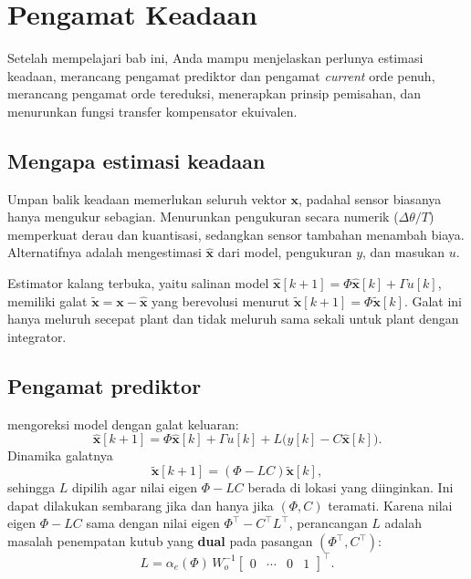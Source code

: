 \chapter{Pengamat Keadaan}
\label{bab:obs}

\begin{tujuan}
	Setelah mempelajari bab ini, Anda mampu menjelaskan perlunya estimasi keadaan, merancang pengamat prediktor dan pengamat \textit{current} orde penuh, merancang pengamat orde tereduksi, menerapkan prinsip pemisahan, dan menurunkan fungsi transfer kompensator ekuivalen.
\end{tujuan}

\section{Mengapa estimasi keadaan}
Umpan balik keadaan memerlukan seluruh vektor $\mathbf{x}$, padahal sensor biasanya hanya mengukur sebagian. Menurunkan pengukuran secara numerik ($\Delta\theta/T$) memperkuat derau dan kuantisasi, sedangkan sensor tambahan menambah biaya. Alternatifnya adalah mengestimasi $\hat{\mathbf{x}}$ dari model, pengukuran $y$, dan masukan $u$.

Estimator kalang terbuka, yaitu salinan model $\hat{\mathbf{x}}[k+1] = \Phi\hat{\mathbf{x}}[k] + \Gamma u[k]$, memiliki galat $\tilde{\mathbf{x}} = \mathbf{x} - \hat{\mathbf{x}}$ yang berevolusi menurut $\tilde{\mathbf{x}}[k+1] = \Phi\tilde{\mathbf{x}}[k]$. Galat ini hanya meluruh secepat plant dan tidak meluruh sama sekali untuk plant dengan integrator.

\section{Pengamat prediktor}
 mengoreksi model dengan galat keluaran:
\begin{equation}
	\hat{\mathbf{x}}[k+1] = \Phi\hat{\mathbf{x}}[k] + \Gamma u[k] + L\big(y[k] - C\hat{\mathbf{x}}[k]\big).
\end{equation}
Dinamika galatnya
\begin{equation}
	\tilde{\mathbf{x}}[k+1] = (\Phi - LC)\tilde{\mathbf{x}}[k],
\end{equation}
sehingga $L$ dipilih agar nilai eigen $\Phi - LC$ berada di lokasi yang diinginkan. Ini dapat dilakukan sembarang jika dan hanya jika $(\Phi, C)$ teramati. Karena nilai eigen $\Phi - LC$ sama dengan nilai eigen $\Phi^\top - C^\top L^\top$, perancangan $L$ adalah masalah penempatan kutub yang \textbf{dual} pada pasangan $(\Phi^\top, C^\top)$:
\begin{equation}
	L = \alpha_e(\Phi)\,W_o^{-1}\begin{bmatrix}0 & \cdots & 0 & 1\end{bmatrix}^\top.
\end{equation}

